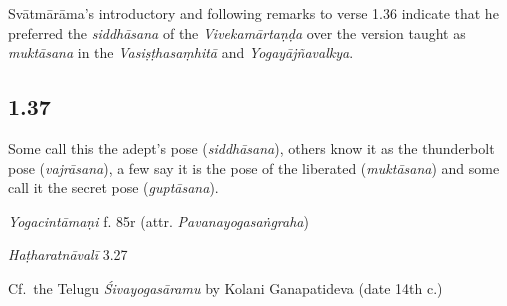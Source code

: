 \begin{ekdosis}
\begin{testimonia}[hp01_036]
\end{testimonia}

\begin{philcomm}[hp01_036]
Svātmārāma's introductory and following remarks to verse 1.36 indicate that he preferred the \emph{siddhāsana} of the \emph{Vivekamārtaṇḍa} over the version taught as \emph{muktāsana} in the \emph{Vasiṣṭhasaṃhitā} and \emph{Yogayājñavalkya}.
\end{philcomm}
\subsection*{1.37}
\begin{translation}[hp01_037]
Some call this the adept's pose (\emph{siddhāsana}), others know it as the thunderbolt pose (\emph{vajrāsana}), a few say it is the pose of the liberated (\emph{muktāsana}) and some call it the secret pose (\emph{guptāsana}).
\end{translation}


\begin{testimonia}[hp01_037]
\emph{Yogacintāmaṇi} f. 85r (attr. \emph{Pavanayogasaṅgraha})

\begin{versinnote}
\end{versinnote}

\emph{Haṭharatnāvalī} 3.27

\begin{versinnote}
\end{versinnote}

Cf.~the Telugu \emph{Śivayogasāramu} by Kolani Ganapatideva (date 14th c.)

\begin{versinnote}
\end{versinnote}


\end{testimonia}
\end{ekdosis}
